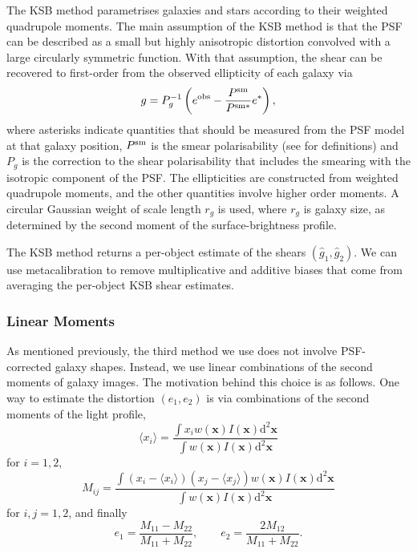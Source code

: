 \documentclass[iop]{emulateapj}
\newcommand\rmcomment[1]{\textcolor{red}{(RM: #1)}}
\begin{document}
The KSB method \citep{1995ApJ...449..460K} parametrises galaxies and
stars according to their weighted quadrupole moments.  The main
assumption of the KSB method is that the PSF can be described as a
small but highly anisotropic distortion convolved with a large
circularly symmetric function.  With that assumption, the shear can be
recovered to first-order from the observed ellipticity of each galaxy
via
\begin{equation} \label{eqn:weight}
g=P_{g}^{-1}\left(e^{\rm obs}-\frac{P^{\rm sm}}{P^{\rm sm*}}e^{*}\right),
\end{equation}
where asterisks indicate quantities that should be measured from the
PSF model at that galaxy position, $P^{\rm sm}$ is the smear
polarisability (see \citealt{2006MNRAS.368.1323H} for definitions) and
$P_g$ is the correction to the shear polarisability that includes
the smearing with the isotropic component of the PSF. The
ellipticities are constructed from weighted quadrupole moments, and
the other quantities involve higher order moments. A circular Gaussian
weight of scale length $r_g$ is used, where $r_g$ is galaxy size, as
determined by the second moment of the surface-brightness profile. 

The KSB method returns a per-object estimate of the shears
$(\hat{g}_1, \hat{g}_2)$. We can use metacalibration to
remove multiplicative and additive biases that come from averaging the
per-object KSB shear estimates.

\subsubsection{Linear Moments}

As mentioned previously, the third method we use does not involve
PSF-corrected galaxy shapes.  Instead, we use linear combinations of
the second moments of galaxy images.  The motivation behind this
choice is as follows.  One way to estimate the distortion $(e_1,e_2)$
is via combinations of the second moments of the light profile,
\begin{equation}
\langle x_i\rangle = \frac{\int x_i w({\mathbf x}) I({\mathbf x}) \mathrm{d}^2{\mathbf x}}{\int w({\mathbf x}) I({\mathbf x}) \mathrm{d}^2{\mathbf x}}
\end{equation}
for $i=1, 2$,
\begin{equation}
M_{ij} = \frac{\int (x_i-\langle x_i\rangle)(x_j-\langle x_j\rangle) w({\mathbf x}) I({\mathbf x}) \mathrm{d}^2{\mathbf x}}{\int w({\mathbf x}) I({\mathbf x}) \mathrm{d}^2{\mathbf x}}
\end{equation}
for $i,j=1,2$, and finally 
\begin{equation}\label{eq:moments-div}
e_1 = \frac{M_{11}-M_{22}}{M_{11}+M_{22}}, \qquad e_2 =\frac{2M_{12}}{M_{11}+M_{22}}.
\end{equation}
\end{document}
